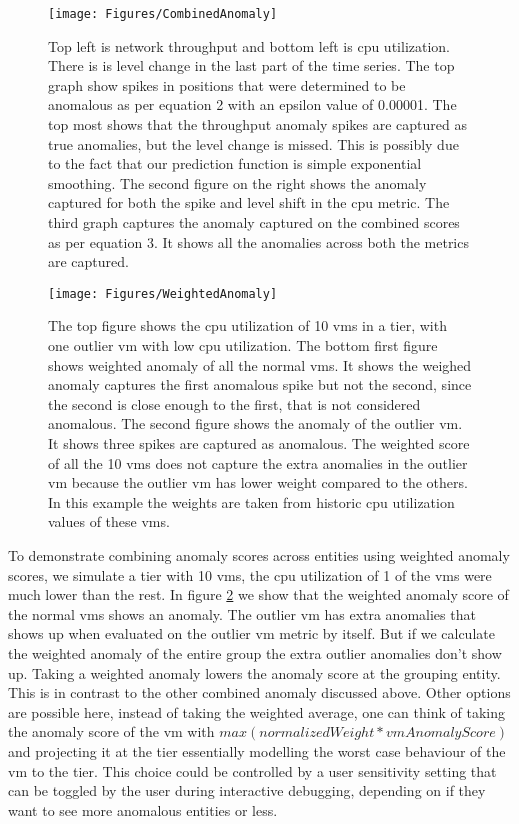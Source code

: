 \documentclass[times, twoside, watermark]{zHenriquesLab-StyleBioRxiv}
\begin{document}
\begin{figure}%
\centering
\texttt{[image: Figures/CombinedAnomaly]}
\caption{Top left is network throughput and bottom left is cpu utilization. There is is level change in the last part of the time series. The top graph show spikes in positions that were determined to be anomalous as per equation 2 with an epsilon value of 0.00001. The top most shows that the throughput anomaly spikes are captured as true anomalies, but the level change is missed. This is possibly due to the fact that our prediction function is simple exponential smoothing. The second figure on the right shows the anomaly captured for both the spike and level shift in the cpu metric. The third graph captures the anomaly captured on the combined scores as per equation 3. It shows all the anomalies across both the metrics are captured.}
\label{fig:CombinedAnomaly}
\end{figure}

\begin{figure}%
\centering
\texttt{[image: Figures/WeightedAnomaly]}
\caption{The top figure shows the cpu utilization of 10 vms in a tier, with one outlier vm with low cpu utilization. The bottom first figure shows weighted anomaly of all the normal vms. It shows the weighed anomaly captures the first anomalous spike but not the second, since the second is close enough to the first, that is not considered anomalous. The second figure shows the anomaly of the outlier vm. It shows three spikes are captured as anomalous. The weighted score of all the 10 vms does not capture the extra anomalies in the outlier vm because the outlier vm has lower weight compared to the others. In this example the weights are taken from historic cpu utilization values of these vms.}
\label{fig:WeightedAnomaly}
\end{figure}

To demonstrate combining anomaly scores across entities using weighted anomaly scores, we simulate a tier with 10 vms, the cpu utilization of 1 of the vms were much lower than the rest. In figure \ref{fig:WeightedAnomaly} we show that the weighted anomaly score of the normal vms shows an anomaly. The outlier vm has extra anomalies that shows up when evaluated on the outlier vm metric by itself. But if we calculate the weighted anomaly of the entire group the extra outlier anomalies don't show up. Taking a weighted anomaly lowers the anomaly score at the grouping entity. This is in contrast to the other combined anomaly discussed above. Other options are possible here, instead of taking the weighted average, one can think of taking the anomaly score of the vm with $max(normalizedWeight * vmAnomalyScore)$ and projecting it at the tier essentially modelling the worst case behaviour of the vm to the tier. This choice could be controlled by a user sensitivity setting that can be toggled by the user during interactive debugging, depending on if they want to see more anomalous entities or less.
\end{document}
